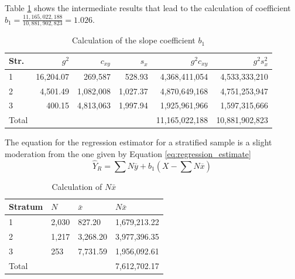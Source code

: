 Table \ref{tab:calculation_slope} shows the intermediate results that lead to the calculation of coefficient $b_1 = \frac{11,165,022,188}{10,881,902,823} = 1.026$.

\begin{table}[htbp]
\begin{tabularx}{\textwidth}{@{}lrrrrr@{}}
\toprule
\parbox[t]{1 cm}{Str.} &
\parbox[t]{1.5cm}{\raggedleft $g^2$} &
\parbox[t]{1.5cm}{\raggedleft $c_{xy}$} &
\parbox[t]{1.5cm}{\raggedleft $s_x$} &
\parbox[t]{2cm}{\raggedleft $g^2 c_{xy}$} &
\parbox[t]{2cm}{\raggedleft $g^2 s_{x}^2$} \\
 & 16,204.07 &   269,587 &   528.93 & 4,368,411,054 & 4,533,333,210 \\
2 &  4,501.49 & 1,082,008 & 1,027.37 & 4,870,649,168 & 4,751,253,947 \\
3 &    400.15 & 4,813,063 & 1,997.94 & 1,925,961,966 & 1,597,315,666 \\
\midrule
Total & & & & 11,165,022,188 & 10,881,902,823 \\
\bottomrule
\end{tabularx}
\caption{Calculation of the slope coefficient $b_1$}
\label{tab:calculation_slope}
\end{table}

\bigskip
The equation for the regression estimator for a stratified sample is a slight moderation from the one given by Equation \ref{eq:regression_estimate}
\begin{equation}
	\hat{Y}_R = \sum{N \overline{y}} + b_1 (X - \sum{N \overline{x}})
\label{eq:regression_estimate_stratified}
\end{equation}

\begin{table}[htbp]
\begin{tabularx}{\textwidth}{@{}lYYY@{}}
\toprule
\parbox[t]{1.4 cm}{Stratum} &
$N$ &
$\bar{x}$ &
$N \bar{x}$ \\

\midrule

1 & 2,030 &   827.20 & 1,679,213.22 \\
2 & 1,217 & 3,268.20 & 3,977,396.35 \\
3 &   253 & 7,731.59 & 1,956,092.61 \\

\midrule

Total & & & 7,612,702.17 \\

\bottomrule
\end{tabularx}
\caption{Calculation of $N \bar{x}$}
\label{tab:calculation_N_times_bar_x}
\end{table}

